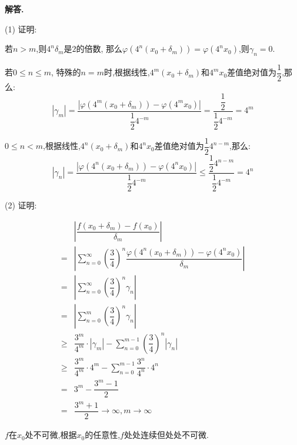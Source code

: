 \documentclass[12pt, a4paper, oneside]{ctexart}
\newenvironment{solution}{\par\noindent\textbf{解答. }}{\par}
\begin{document}
\begin{solution}
\par
(1)     证明:
\par
若$n>m$,则$4^n\delta_m$是$2$的倍数, 那么$\varphi(4^n(x_0+\delta_m))=\varphi(4^nx_0)$,则$\gamma_n=0$.
\par
若$0\leqslant n \leqslant m$, 特殊的$n=m$时,根据线性,$4^m(x_0+\delta_m)$和$4^mx_0$差值绝对值为$\dfrac{1}{2}$,那么:
$$
|\gamma_m|=\dfrac{|\varphi(4^m(x_0+\delta_m))-\varphi(4^mx_0)|}{\dfrac{1}{2}4^{-m}}=\dfrac{\dfrac{1}{2}}{\dfrac{1}{2}4^{-m}}=4^m
$$
\par
$0\leqslant n<m$,根据线性,$4^n(x_0+\delta_m)$和$4^nx_0$差值绝对值为$\dfrac{1}{2}4^{n-m}$,那么:
$$
|\gamma_n|=\dfrac{|\varphi(4^n(x_0+\delta_m))-\varphi(4^nx_0)|}{\dfrac{1}{2}4^{-m}}\leqslant \dfrac{\dfrac{1}{2}4^{n-m}}{\dfrac{1}{2}4^{-m}}=4^n
$$
\par
(2)    证明:
\par
$$
\begin{aligned}
&\left|\dfrac{f(x_0+\delta_m)-f(x_0)}{\delta_m}\right|\\
=&\left|\sum_{n=0}^{\infty}\left(\dfrac{3}{4}\right)^n\dfrac{\varphi(4^n(x_0+\delta_m))-\varphi(4^nx_0)}{\delta_m}\right|\\
=&\left|\sum_{n=0}^{\infty}\left(\dfrac{3}{4}\right)^n\gamma_n\right|\\
=&\left|\sum_{n=0}^{m}\left(\dfrac{3}{4}\right)^n\gamma_n\right|\\
\geqslant& \dfrac{3^m}{4^m}\cdot |\gamma_m|-\sum_{n=0}^{m-1}\left(\dfrac{3}{4}\right)^n|\gamma_n|\\
\geqslant & \dfrac{3^m}{4^m}\cdot 4^m-\sum_{n=0}^{m-1}\dfrac{3^n}{4^n}\cdot 4^n\\
=&3^m-\dfrac{3^m-1}{2}\\
=&\dfrac{3^m+1}{2}\to \infty, m \to \infty
\end{aligned}
$$
\par
$f$在$x_0$处不可微,根据$x_0$的任意性,$f$处处连续但处处不可微.
\end{solution}
\end{document}
